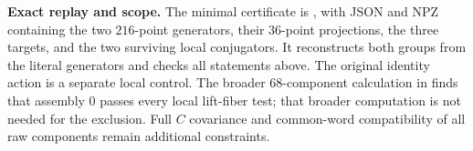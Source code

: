 \medskip\noindent\textbf{Exact replay and scope.}\quad
The minimal certificate is
,
with JSON and NPZ containing the two $216$-point generators,
their $36$-point projections, the three targets, and the two
surviving local conjugators. It reconstructs both groups
from the literal generators and checks all statements above.
The original identity action is a separate local control.
The broader $68$-component calculation in
finds that assembly $0$ passes every local lift-fiber test;
that broader computation is not needed for the exclusion.
Full $C$ covariance and common-word compatibility of all
raw components remain additional constraints.
